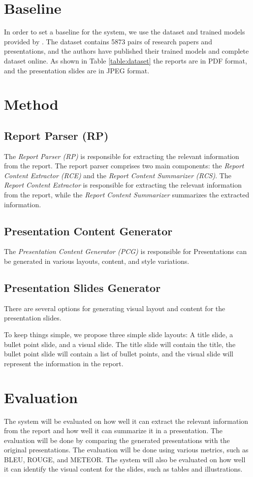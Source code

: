 \section{Baseline}
In order to set a baseline for the system, we use the dataset and trained models provided by \citep{Fu:2022:AAAI}. The dataset contains 5873 pairs of research papers and presentations, and the authors have published their trained models and complete dataset online. As shown in Table \ref{table:dataset} the reports are in PDF format, and the presentation slides are in JPEG format. 

\section{Method}

\subsection{Report Parser (RP)}
The \emph{Report Parser (RP)} is responsible for extracting the relevant information from the report. The report parser comprises two main components: the \emph{Report Content Extractor (RCE)} and the \emph{Report Content Summarizer (RCS)}. The \emph{Report Content Extractor} is responsible for extracting the relevant information from the report, while the \emph{Report Content Summarizer} summarizes the extracted information.

\subsection{Presentation Content Generator}
The \emph{Presentation Content Generator (PCG)} is responsible for 
Presentations can be generated in various layouts, content, and style variations. 

\subsection{Presentation Slides Generator}
There are several options for generating visual layout and content for the presentation slides. 

To keep things simple, we propose three simple slide layouts: A title slide, a bullet point slide, and a visual slide. The title slide will contain the title, the bullet point slide will contain a list of bullet points, and the visual slide will represent the information in the report.

\section{Evaluation}
The system will be evaluated on how well it can extract the relevant information from the report and how well it can summarize it in a presentation. The evaluation will be done by comparing the generated presentations with the original presentations. The evaluation will be done using various metrics, such as BLEU, ROUGE, and METEOR. The system will also be evaluated on how well it can identify the visual content for the slides, such as tables and illustrations.

